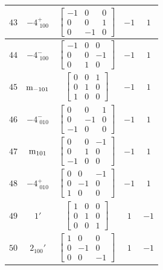 \documentclass[fleqn,8pt]{jsarticle}
\begin{document}
\begin{longtable}{ccccc}
$ 43 $ & $ -4^{+}_{\,\,100} $ & $ \begin{bmatrix} -1 & 0 & 0 \\ 0 & 0 & 1 \\ 0 & -1 & 0 \end{bmatrix} $ & $ -1 $ & $ 1 $ \\ \hline
$ 44 $ & $ -4^{-}_{\,\,100} $ & $ \begin{bmatrix} -1 & 0 & 0 \\ 0 & 0 & -1 \\ 0 & 1 & 0 \end{bmatrix} $ & $ -1 $ & $ 1 $ \\ \hline
$ 45 $ & $ {\rm m}_{-101} $ & $ \begin{bmatrix} 0 & 0 & 1 \\ 0 & 1 & 0 \\ 1 & 0 & 0 \end{bmatrix} $ & $ -1 $ & $ 1 $ \\ \hline
$ 46 $ & $ -4^{-}_{\,\,010} $ & $ \begin{bmatrix} 0 & 0 & 1 \\ 0 & -1 & 0 \\ -1 & 0 & 0 \end{bmatrix} $ & $ -1 $ & $ 1 $ \\ \hline
$ 47 $ & $ {\rm m}_{101} $ & $ \begin{bmatrix} 0 & 0 & -1 \\ 0 & 1 & 0 \\ -1 & 0 & 0 \end{bmatrix} $ & $ -1 $ & $ 1 $ \\ \hline
$ 48 $ & $ -4^{+}_{\,\,010} $ & $ \begin{bmatrix} 0 & 0 & -1 \\ 0 & -1 & 0 \\ 1 & 0 & 0 \end{bmatrix} $ & $ -1 $ & $ 1 $ \\ \hline
$ 49 $ & $ 1{}' $ & $ \begin{bmatrix} 1 & 0 & 0 \\ 0 & 1 & 0 \\ 0 & 0 & 1 \end{bmatrix} $ & $ 1 $ & $ -1 $ \\ \hline
$ 50 $ & $ 2{}_{100}{}' $ & $ \begin{bmatrix} 1 & 0 & 0 \\ 0 & -1 & 0 \\ 0 & 0 & -1 \end{bmatrix} $ & $ 1 $ & $ -1 $ \\ \hline

\end{longtable}
\end{document}
